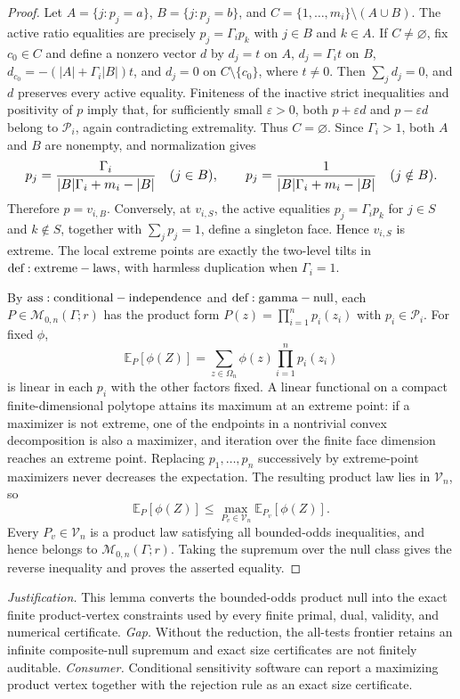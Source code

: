 \documentclass{article}
\begin{document}
\begin{proof}
Let \(A=\{j:p_j=a\}\), \(B=\{j:p_j=b\}\), and \(C=\{1,\ldots,m_i\}\setminus(A\cup B)\). The active ratio equalities are precisely \(p_j=\Gamma_i p_k\) with \(j\in B\) and \(k\in A\). If \(C\neq\varnothing\), fix \(c_0\in C\) and define a nonzero vector \(d\) by \(d_j=t\) on \(A\), \(d_j=\Gamma_i t\) on \(B\), \(d_{c_0}=-(|A|+\Gamma_i|B|)t\), and \(d_j=0\) on \(C\setminus\{c_0\}\), where \(t\neq0\). Then \(\sum_jd_j=0\), and \(d\) preserves every active equality. Finiteness of the inactive strict inequalities and positivity of \(p\) imply that, for sufficiently small \(\varepsilon>0\), both \(p+\varepsilon d\) and \(p-\varepsilon d\) belong to \(\mathcal P_i\), again contradicting extremality. Thus \(C=\varnothing\). Since \(\Gamma_i>1\), both \(A\) and \(B\) are nonempty, and normalization gives
\[
\makebox[\linewidth][c]{\resizebox{0.98\linewidth}{!}{\par\noindent \makebox[\linewidth][c]{\resizebox{0.98\linewidth}{!}{\(\displaystyle \displaystyle p_j=\frac{\Gamma_i}{|B|\Gamma_i+m_i-|B|}\quad(j\in B),\qquad p_j=\frac{1}{|B|\Gamma_i+m_i-|B|}\quad(j\notin B).\)}}\par\noindent}}
\]
Therefore \(p=v_{i,B}\). Conversely, at \(v_{i,S}\), the active equalities \(p_j=\Gamma_i p_k\) for \(j\in S\) and \(k\notin S\), together with \(\sum_jp_j=1\), define a singleton face. Hence \(v_{i,S}\) is extreme. The local extreme points are exactly the two-level tilts in \({\rm def:extreme-laws}\), with harmless duplication when \(\Gamma_i=1\).

By \({\rm ass:conditional-independence}\) and \({\rm def:gamma-null}\), each \(P\in\mathcal M_{0,n}(\Gamma;r)\) has the product form \(P(z)=\prod_{i=1}^np_i(z_i)\) with \(p_i\in\mathcal P_i\). For fixed \(\phi\),
\[
 \mathbb E_P[\phi(Z)]=\sum_{z\in\Omega_n}\phi(z)\prod_{i=1}^np_i(z_i)
\]
is linear in each \(p_i\) with the other factors fixed. A linear functional on a compact finite-dimensional polytope attains its maximum at an extreme point: if a maximizer is not extreme, one of the endpoints in a nontrivial convex decomposition is also a maximizer, and iteration over the finite face dimension reaches an extreme point. Replacing \(p_1,\ldots,p_n\) successively by extreme-point maximizers never decreases the expectation. The resulting product law lies in \(\mathcal V_n\), so
\[
 \mathbb E_P[\phi(Z)]\leq\max_{P_v\in\mathcal V_n}\mathbb E_{P_v}[\phi(Z)].
\]
Every \(P_v\in\mathcal V_n\) is a product law satisfying all bounded-odds inequalities, and hence belongs to \(\mathcal M_{0,n}(\Gamma;r)\). Taking the supremum over the null class gives the reverse inequality and proves the asserted equality.
\end{proof}
\par\smallskip\noindent \textit{Justification.} This lemma converts the bounded-odds product null into the exact finite product-vertex constraints used by every finite primal, dual, validity, and numerical certificate. \textit{Gap.} Without the reduction, the all-tests frontier retains an infinite composite-null supremum and exact size certificates are not finitely auditable. \textit{Consumer.} Conditional sensitivity software can report a maximizing product vertex together with the rejection rule as an exact size certificate.
\end{document}
